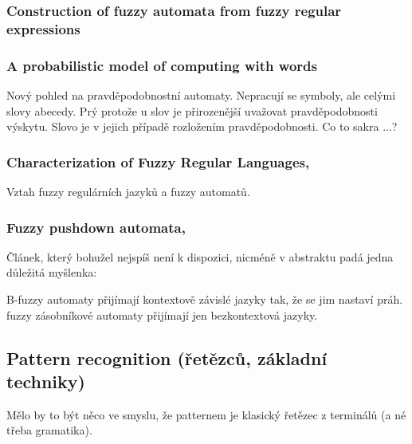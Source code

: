 \documentclass[a4paper,10pt]{article}
\begin{document}
\subsubsection*{Construction of fuzzy automata from fuzzy regular expressions \cite{StaCir-ConsFuzzAutFuzzRegExp}}

\subsubsection*{A probabilistic model of computing with words \cite{QiuWan-ProbModCompWords}}
Nový pohled na pravděpodobnostní automaty. Nepracují se symboly, ale celými slovy abecedy. Prý protože u slov je přirozenější uvažovat pravděpodobnosti výskytu. Slovo je v jejich případě rozložením pravděpodobnosti. Co to sakra ...?


\subsubsection*{Characterization of Fuzzy Regular Languages, \cite{RamGir-CharFuzzRegLang}}
Vztah fuzzy regulárních jazyků a fuzzy automatů. 

\subsubsection*{Fuzzy pushdown automata, \cite{BucPas-FuzzPushAut}}

Článek, který bohužel nejspíš není k dispozici, nicméně v abstraktu padá jedna důležitá myšlenka:

B-fuzzy automaty přijímají kontextově závislé jazyky tak, že se jim nastaví práh.  fuzzy zásobníkové automaty přijímají jen bezkontextová jazyky.

\subsection{Pattern recognition (řetězců, základní techniky)}

\begin{definition}
\end{definition}

\begin{definition}
Mělo by to být něco ve smyslu, že patternem je klasický řetězec z terminálů (a né třeba gramatika).
\end{definition}
\end{document}
